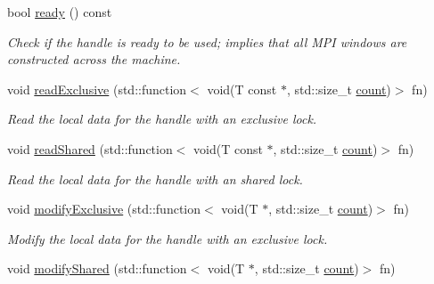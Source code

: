 \begin{DoxyCompactItemize}
bool \hyperlink{structvt_1_1rdma_1_1_handle_3_01_t_00_01_e_00_01_index_t_00_01typename_01std_1_1enable__if__t_3_d15dac1b5db6e2bc0fb0b8aca42b1456_a860f35e2562f8ab0e5606281315d2e17}{ready} () const
\begin{DoxyCompactList}\small\item\em Check if the handle is ready to be used; implies that all M\+PI windows are constructed across the machine. \end{DoxyCompactList}\item 
void \hyperlink{structvt_1_1rdma_1_1_handle_3_01_t_00_01_e_00_01_index_t_00_01typename_01std_1_1enable__if__t_3_d15dac1b5db6e2bc0fb0b8aca42b1456_adc7b1058678ece326e044eac9d4c83cf}{read\+Exclusive} (std\+::function$<$ void(T const $\ast$, std\+::size\+\_\+t \hyperlink{structvt_1_1rdma_1_1_base_typed_handle_a1e7937b5cf4b641a783c37675ae2cc35}{count})$>$ fn)
\begin{DoxyCompactList}\small\item\em Read the local data for the handle with an exclusive lock. \end{DoxyCompactList}\item 
void \hyperlink{structvt_1_1rdma_1_1_handle_3_01_t_00_01_e_00_01_index_t_00_01typename_01std_1_1enable__if__t_3_d15dac1b5db6e2bc0fb0b8aca42b1456_a20ad220782a771d3b4b1a63b963f7adf}{read\+Shared} (std\+::function$<$ void(T const $\ast$, std\+::size\+\_\+t \hyperlink{structvt_1_1rdma_1_1_base_typed_handle_a1e7937b5cf4b641a783c37675ae2cc35}{count})$>$ fn)
\begin{DoxyCompactList}\small\item\em Read the local data for the handle with an shared lock. \end{DoxyCompactList}\item 
void \hyperlink{structvt_1_1rdma_1_1_handle_3_01_t_00_01_e_00_01_index_t_00_01typename_01std_1_1enable__if__t_3_d15dac1b5db6e2bc0fb0b8aca42b1456_a193a769321ba99cb7c999118d195d158}{modify\+Exclusive} (std\+::function$<$ void(T $\ast$, std\+::size\+\_\+t \hyperlink{structvt_1_1rdma_1_1_base_typed_handle_a1e7937b5cf4b641a783c37675ae2cc35}{count})$>$ fn)
\begin{DoxyCompactList}\small\item\em Modify the local data for the handle with an exclusive lock. \end{DoxyCompactList}\item 
void \hyperlink{structvt_1_1rdma_1_1_handle_3_01_t_00_01_e_00_01_index_t_00_01typename_01std_1_1enable__if__t_3_d15dac1b5db6e2bc0fb0b8aca42b1456_a1e54b62400f4e12e2e7e4862851352c9}{modify\+Shared} (std\+::function$<$ void(T $\ast$, std\+::size\+\_\+t \hyperlink{structvt_1_1rdma_1_1_base_typed_handle_a1e7937b5cf4b641a783c37675ae2cc35}{count})$>$ fn)

\end{DoxyCompactItemize}
